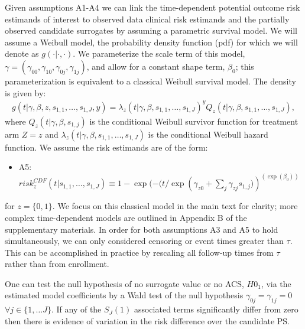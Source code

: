 \documentclass[times, doublespace]{simauth}
\begin{document}
Given assumptions A1-A4 we can link the time-dependent potential outcome risk estimands of interest to observed data clinical risk estimands and the partially observed candidate surrogates by assuming a parametric survival model. We will assume a Weibull model, the probability density function (pdf) for which we will denote as $g(\cdot|\cdot,\cdot)$. We parameterize the scale term of this model, $\gamma=(\gamma_{00}, \gamma_{10},\gamma_{0j}, \gamma_{1j})$, and allow for a constant shape term, $\beta_{0}$; this parameterization is equivalent to a classical Weibull survival model. The density is given by:
\begin{eqnarray*}
g(t|\gamma, \beta, z, s_{1,1}, \ldots,s_{1,J}, y)=\lambda_z(t|\gamma, \beta, s_{1,1}, \ldots, s_{1,J})^{y} Q_z(t|\gamma, \beta, s_{1,1}, \ldots, s_{1,J}),
\end{eqnarray*}
where $Q_z(t|\gamma, \beta, s_{1,j})$ is the conditional Weibull survivor function for treatment arm $Z=z$ and $\lambda_z(t|\gamma, \beta, s_{1,1}, \ldots, s_{1,J})$ is the conditional Weibull hazard function. We assume the risk estimands are of the form:
\begin{itemize}
\item A5: $risk_{z}^{CDF}(t|s_{1,1}, \ldots, s_{1,J}) \equiv 1-\exp(-(t/\exp(\gamma_{z0}+\sum_j{\gamma_{zj}s_{1,j})})^{(\exp(\beta_{0}))}$
\end{itemize}
for $z=\{0,1\}$. We focus on this classical model in the main text for clarity; more complex time-dependent models are outlined in Appendix B of the supplementary materials. In order for both assumptions A3 and A5 to hold simultaneously, we can only considered censoring or event times greater than $\tau$. This can be accomplished in practice by rescaling all follow-up times from $\tau$ rather than from enrollment.

One can test the null hypothesis of no surrogate value or no ACS, $H0_1$, via the estimated model coefficients by a Wald test of the null hypothesis $\gamma_{0j}=\gamma_{1j}=0$ $\forall j \in \{1,\ldots J\}$. If any of the $S_{J}(1)$ associated terms significantly differ from zero then there is evidence of variation in the risk difference over the candidate PS. 
\end{document}
